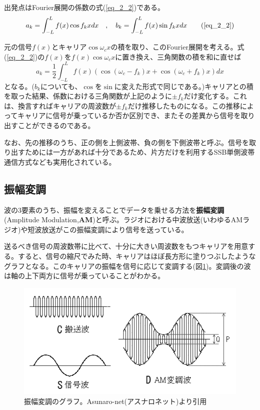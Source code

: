 出発点はFourier展開の係数の式(\ref{eq_2_2})である。
\begin{equation}
a_k=\int^{L}_{-L} f(x) \cos f_kx dx \quad , \quad b_k=\int^{L}_{-L} f(x) \sin f_kx dx \tag{\ref{eq_2_2}}
\end{equation}

元の信号$f(x)$とキャリア$\cos \omega_c x$の積を取り、このFourier展開を考える。式(\ref{eq_2_2})の$f(x)$を$f(x)\cos \omega_c x$に置き換え、三角関数の積を和に直せば
\begin{equation}
a_k=\frac{1}{2}\int^{L}_{-L} f(x) \left(\cos (\omega_c-f_k) x + \cos (\omega_c+f_k) x \right)dx \label{eq_6_1}
\end{equation}
となる。($b_k$についても、$\cos$を$\sin$に変えた形式で同じである。)キャリアとの積を取った結果、係数における三角関数が上記のように$\pm f_k$だけ変化する。これは、換言すればキャリアの周波数が$\pm f_k$だけ推移したものになる。この推移によってキャリアに信号が乗っているか否か区別でき、またその差異から信号を取り出すことができるのである。

なお、先の推移のうち、正の側を上側波帯、負の側を下側波帯と呼ぶ。信号を取り出すためには一方があれば十分であるため、片方だけを利用するSSB単側波帯通信方式なども実用化されている。

\subsection{振幅変調}

波の3要素のうち、振幅を変えることでデータを乗せる方法を\textbf{振幅変調}(Amplitude Modulation,\textbf{AM})と呼ぶ。ラジオにおける中波放送(いわゆるAMラジオ)や短波放送がこの振幅変調により信号を送っている。

送るべき信号の周波数帯に比べて、十分に大きい周波数をもつキャリアを用意する。すると、信号の縮尺でみた時、キャリアはほぼ長方形に塗りつぶしたようなグラフとなる。このキャリアの振幅を信号に応じて変調する(図\ref{fig6_2})。変調後の波は軸の上下両方に信号が乗っていることがわかる。

\begin{figure}[htb]
\centering
\includegraphics[width=0.6\linewidth,keepaspectratio,bb=0 0 489 245]{fig/fig6_2.png}
\caption{振幅変調のグラフ。Asunaro-net(アスナロネット)より引用}\label{fig6_2}
\end{figure}


